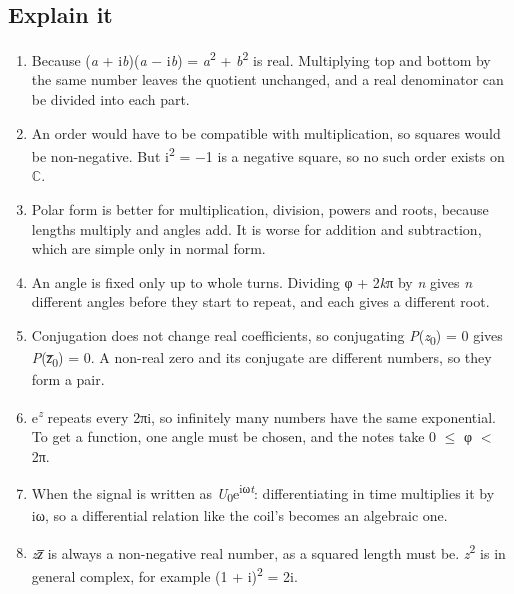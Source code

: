 \documentclass[11pt]{article}
\begin{document}
\begin{keepsection}\subsection{Explain it}

\begin{enumerate}
\item Because (\textit{a} + i\textit{b})(\textit{a} \ensuremath{-} i\textit{b}) = \textit{a}\textsuperscript{2} + \textit{b}\textsuperscript{2} is real. Multiplying top and bottom by the same number leaves the quotient unchanged, and a real denominator can be divided into each part.
\item An order would have to be compatible with multiplication, so squares would be non-negative. But i\textsuperscript{2} = \ensuremath{-}1 is a negative square, so no such order exists on \ensuremath{\mathbb{C}}.
\item Polar form is better for multiplication, division, powers and roots, because lengths multiply and angles add. It is worse for addition and subtraction, which are simple only in normal form.
\item An angle is fixed only up to whole turns. Dividing φ + 2\textit{k}π by \textit{n} gives \textit{n} different angles before they start to repeat, and each gives a different root.
\item Conjugation does not change real coefficients, so conjugating \textit{P}(\textit{z}\textsubscript{0}) = 0 gives \textit{P}(\textit{z̅}\textsubscript{0}) = 0. A non-real zero and its conjugate are different numbers, so they form a pair.
\item e\textsuperscript{\textit{z}} repeats every 2πi, so infinitely many numbers have the same exponential. To get a function, one angle must be chosen, and the notes take 0 \ensuremath{\leq} φ \ensuremath{<} 2π.
\item When the signal is written as \textit{U}\textsubscript{0}e\textsuperscript{iω\textit{t}}: differentiating in time multiplies it by iω, so a differential relation like the coil’s becomes an algebraic one.
\item \textit{z}\textit{z̅} is always a non-negative real number, as a squared length must be. \textit{z}\textsuperscript{2} is in general complex, for example (1 + i)\textsuperscript{2} = 2i.
\end{enumerate}

\end{keepsection}
\end{document}
